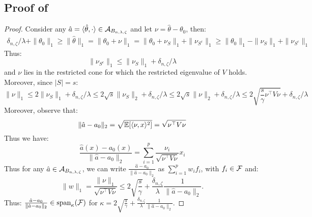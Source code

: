 \subsection{Proof of }

\begin{proof}
Consider any $\hat{a}=\langle \hat{\theta}, \cdot \rangle\in {\mathcal A}_{B_{n,\lambda,\zeta}}$ and let $\nu=\hat{\theta} - \theta_0$, then:
\begin{align}
    \delta_{n,\zeta}/\lambda + \|\theta_0\|_1 \geq \|\hat{\theta}\|_1 =\|\theta_0 + \nu\|_1 = \|\theta_0 + \nu_S\|_1+\|\nu_{S^c}\|_1 \geq \|\theta_0\|_1 - \|\nu_S\|_1 + \|\nu_{S^c}\|_1
\end{align}
Thus:
\begin{equation}
    \|\nu_{S^c}\|_1\leq \|\nu_S\|_1 + \delta_{n,\zeta}/\lambda
\end{equation}
and $\nu$ lies in the restricted cone for which the restricted eigenvalue of $V$ holds. Moreover, since $|S|=s$:
\begin{equation}
    \|\nu\|_1 \leq 2 \|\nu_S\|_1 + \delta_{n,\zeta}/\lambda \leq 2\sqrt{s} \|\nu_S\|_2  + \delta_{n,\zeta}/\lambda \leq 2\sqrt{s}\|\nu\|_2  + \delta_{n,\zeta}/\lambda \leq 2 \sqrt{\frac{s}{\gamma} \nu^\top  V \nu}  + \delta_{n,\zeta}/\lambda 
\end{equation}
Moreover, observe that: 
\begin{equation}
    \|\hat{a}-a_0\|_2 = \sqrt{\mathbb{E}[ \langle \nu, x \rangle^2 ]} = \sqrt{\nu^\top  V \nu} 
\end{equation}
Thus we have:
\begin{equation}
    \frac{\hat{a}(x)-a_0(x)}{\|\hat{a}-a_0\|_2} = \sum_{i=1}^p \frac{\nu_i}{\sqrt{\nu^\top V\nu}} x_i 
\end{equation}
Thus for any $\hat{a}\in {\mathcal A}_{B_{n,\lambda,\zeta}}$, we can write $\frac{\hat{a}-a_0}{\|\hat{a}-a_0\|_2}$ as $\sum_{i=1}^p w_i f_i$, with $f_i\in {\mathcal F}$ and:
\begin{equation}
    \|w\|_1 = \frac{\|\nu\|_1}{\sqrt{\nu^\top V \nu}} \leq 2\sqrt{\frac{s}{\gamma}} + \frac{\delta_{n,\zeta}}{\lambda} \frac{1}{\|\hat{a}-a_0\|_2}.
\end{equation}
Thus: $\frac{\hat{a}-a_0}{\|\hat{a}-a_0\|_2} \in \text{span}_{\kappa}({\mathcal F})$ for $\kappa=2\sqrt{\frac{s}{\gamma}} + \frac{\delta_{n,\zeta}}{\lambda} \frac{1}{\|\hat{a}-a_0\|_2}$.


\end{proof}
